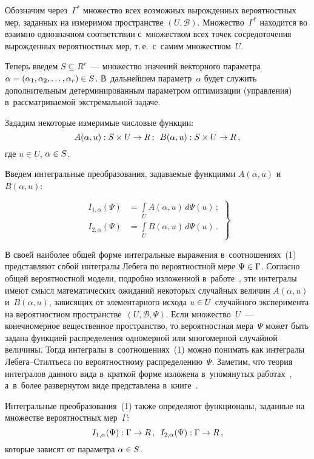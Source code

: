 \begin{multicols}{2}
     Обозначим через~$\Gamma^*$ множество всех возможных вырожденных 
вероятностных мер, заданных на измеримом пространстве $(U,\mathcal{B})$. 
Множество~$\Gamma^*$ находится во взаимно однозначном соответствии 
с~множеством всех точек сосредоточения вы\-рож\-ден\-ных вероятностных мер, 
т.\,е.\ с~самим множеством~$U$.
     
     Теперь введем $S\subseteq R^r$~--- множество значений векторного 
па\-ра\-мет\-ра $\alpha\hm= (\alpha_1,\alpha_2,\hm\ldots , \alpha_r)\hm\in S$. В~дальнейшем 
параметр~$\alpha$ будет служить дополнительным детерминированным 
параметром оптимизации (управ\-ле\-ния) в~рассматриваемой экстремальной 
задаче.
     
     Зададим некоторые измеримые чис\-ло\-вые функции:
$$
A(\alpha, u): S\times U \to R\,;\enskip B(\alpha, u): S\times U\to R\,,
$$
где $u\in U$, $\alpha\hm\in S$.
     
Введем интегральные преобразования, за\-да\-ва\-емые функциями $A(\alpha,u)$
и~$B(\alpha, u)$:

\noindent
\begin{equation}
\left. 
\begin{array}{rl}
I_{1,\alpha}(\Psi)&=\displaystyle\int\limits_U A(\alpha, u)\,d\Psi(u)\,;\\
I_{2,\alpha}(\Psi) &=\displaystyle\int\limits_U B(\alpha, u)\,d\Psi(u)\,.
\end{array}
\right\}
\label{e1-shn}
\end{equation}

В своей наиболее общей форме интегральные выражения 
в~соотношениях~(1) пред\-став\-ля\-ют собой интегралы Лебега по вероятностной 
мере $\Psi\hm\in \Gamma$. Согласно общей вероятностной модели, по\-дроб\-но 
изложенной в~работе~\cite[гл.~II]{10-shn}, эти интегралы имеют смысл 
математических ожиданий некоторых случайных величин $A(\alpha, u)$ 
и~$B(\alpha, u)$, зависящих от элементарного исхода $u\hm\in U$ случайного 
эксперимента на вероятностном пространстве~$(U,\mathcal{B},\Psi)$. Если 
множество~$U$~--- конечномерное вещественное про\-стран\-ст\-во, то 
вероятностная мера~$\Psi$ может быть задана функцией распределения 
одномерной или многомерной случайной величины. Тогда интегралы 
в~соотношениях~(1) можно понимать как интегралы Ле\-бе\-га--Стилть\-еса по 
вероятностному распределению~$\Psi$. Заметим, что теория интегралов 
данного вида в~краткой форме изложена в~упомянутых работах~\cite{9-shn, 
10-shn}, а~в~более развернутом виде представлена в~книге~\cite{11-shn}.
     
     Интегральные преобразования~(1) также определяют функционалы, 
заданные на множестве вероятностных мер~$\Gamma$: 
     $$
     I_{1,\alpha}(\Psi):\Gamma\to R\,,\enskip I_{2,\alpha}(\Psi): \Gamma\to R\,,
     $$
которые зависят от параметра $\alpha\hm\in S$.
     

\end{multicols}
